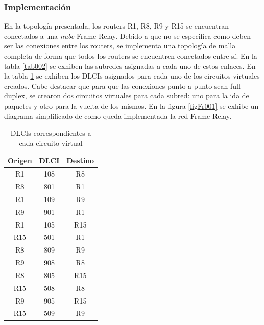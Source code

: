 		\subsubsection{Implementación}
			\indent En la topología presentada, los routers R1, R8, R9 y R15 se encuentran conectados a una \textit{nube} Frame Relay. Debido a que no se especifica
			como deben ser las conexiones entre los routers, se implementa una topología de malla completa de forma que todos los routers se encuentren conectados
			entre sí. En la tabla \ref{tab002} se exhiben las subredes asignadas a cada uno de estos enlaces. En la tabla \ref{tabFr001} se exhiben los DLCIs 
			asignados para cada uno de los circuitos virtuales creados. Cabe destacar que para que las conexiones punto a punto sean full-duplex, se crearon dos 
			circuitos virtuales para cada subred: uno para la ida de paquetes y otro para la vuelta de los mismos. En la figura \ref{figFr001} se exhibe un diagrama 	
			simplificado de como queda implementada la red Frame-Relay. 

			\begin{table}[!htbp]
				\centering
				\begin{tabular}{|c|c|c|}
					\hline
					Origen & DLCI & Destino	\\	
					\hline
					R1 & 108 & R8 \\
					\hline
					R8 & 801 & R1 \\
					\hline
					R1 & 109 & R9 \\
					\hline
					R9 & 901 & R1 \\
					\hline
					R1 & 105 & R15 \\	
					\hline 
					R15 & 501 & R1 \\
					\hline
					R8 & 809 & R9 \\
					\hline
					R9 & 908 & R8 \\
					\hline
					R8 & 805 & R15 \\
					\hline 
					R15 & 508 & R8 \\
					\hline
					R9 & 905 & R15 \\
					\hline
					R15 & 509 & R9 \\
					\hline
				\end{tabular}
				\caption{DLCIs correspondientes a cada circuito virtual}
				\label{tabFr001}
			\end{table}
 

